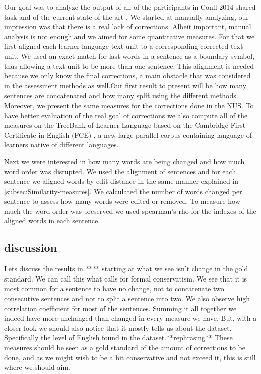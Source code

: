 \documentclass[11pt]{article}
\begin{document}
Our goal was to analyze the output of all of the participants in Conll
2014 shared task\cite{ng2014conll} and of the current state of the
art \cite{rozovskaya2014building}. We started at manually analyzing,
our impression was that there is a real lack of corrections. Albeit
important, manual analysis is not enough and we aimed for some quantitative
measures. For that we first aligned each learner language text unit
to a corresponding corrected text unit. We used an exact match for
last words in a sentence as a boundary symbol, thus allowing a text
unit to be more than one sentence. This alignment is needed because
we only know the final corrections, a main obstacle that was considered
in the assessment methods as well\cite{dahlmeier2012better}.Our first
result to present will be how many sentences are concatenated and
how many split using the different methods. Moreover, we present the
same measures for the corrections done in the NUS\cite{dahlmeier2013building}.
To have better evaluation of the real goal of corrections we also
compute all of the measures on the TreeBank of Learner Language \cite{berzak2016universal}based
on the Cambridge First Certificate in English (FCE) \cite{yannakoudakis2011new},
a new large parallel corpus containing language of learners native
of different languages.

Next we were interested in how many words are being changed and how
much word order was disrupted. We used the alignment of sentences
and for each sentence we aligned words by edit distance in the same
manner explained in \ref{subsec:Similarity-measures}. We calculated
the number of words changed per sentence to assess how many words
were edited or removed. To measure how much the word order was preserved
we used spearman's rho for the indexes of the aligned words in each
sentence.

\subsection{discussion}

Lets discuss the results in {*}{*}{*}{*} starting at what we see isn't
change in the gold standard. We can call this what calls for formal
conservatism. We see that it is most common for a sentence to have
no change, not to concatenate two consecutive sentences and not to
split a sentence into two. We also observe high correlation coefficient
for most of the sentences. Summing it all together we indeed have
more unchanged than changed in every measure we have. But, with a
closer look we should also notice that it mostly tells us about the
dataset. Specifically the level of English found in the dataset.{*}{*}rephrasing{*}{*}
These measures should be seen as a gold standard of the amount of
corrections to be done, and as we might wish to be a bit conservative
and not exceed it, this is still where we should aim.
\end{document}
